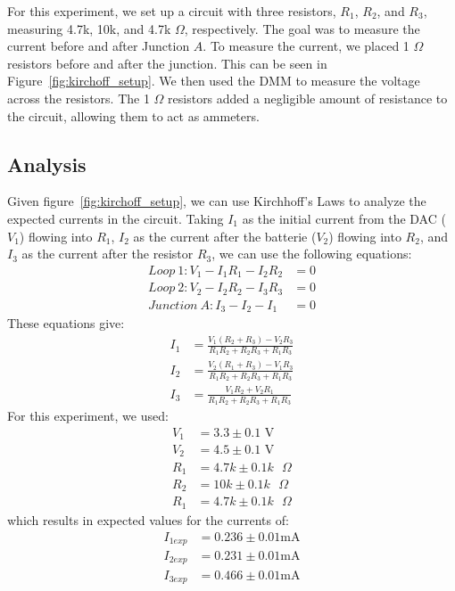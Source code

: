\documentclass[11pt]{article}
\begin{document}
    For this experiment, we set up a circuit with three resistors, $R_1$, $R_2$, and $R_3$, measuring 4.7k, 10k, and 4.7k $\Omega$, respectively.
    The goal was to measure the current before and after Junction $A$.
    To measure the current, we placed 1 $\Omega$ resistors before and after the junction.
    This can be seen in Figure~\ref{fig:kirchoff_setup}.
    We then used the DMM to measure the voltage across the resistors.
    The 1 $\Omega$ resistors added a negligible amount of resistance to the circuit, allowing them to act as ammeters.

    \subsection{Analysis}\label{subsec:kirchoff_analysis}

    Given figure~\ref{fig:kirchoff_setup}, we can use Kirchhoff's Laws to analyze the expected currents in the circuit.
    Taking $I_1$ as the initial current from the DAC ($V_1$) flowing into $R_1$, $I_2$ as the current after the batterie ($V_2$) flowing into $R_2$, and $I_3$ as the current after the resistor $R_3$, we can use the following equations:
    \begin{align*}
        Loop~1: V_1 - I_1 R_1 - I_2 R_2 &= 0 \\
        Loop~2: V_2 - I_2 R_2 - I_3 R_3 &= 0 \\
        Junction~A: I_3 - I_2 - I_1 &= 0
    \end{align*}
    These equations give:
    \begin{align*}
        I_1 &= \frac{V_1(R_2 + R_3) - V_2 R_3}{R_1 R_2 + R_2 R_3 + R_1 R_3} \\
        I_2 &= \frac{V_2(R_1 + R_3) - V_1 R_3}{R_1 R_2 + R_2 R_3 + R_1 R_3} \\
        I_3 &= \frac{V_1 R_2 + V_2 R_1}{R_1 R_2 + R_2 R_3 + R_1 R_3}
    \end{align*}
    For this experiment, we used:
    \begin{align*}
        V_1 &= 3.3 \pm 0.1 \text{ V} \\
        V_2 &= 4.5 \pm 0.1 \text{ V} \\
        R_1 &= 4.7k \pm 0.1k \text{ $\Omega$} \\
        R_2 &= 10k \pm 0.1k \text{ $\Omega$} \\
        R_1 &= 4.7k \pm 0.1k \text{ $\Omega$}
    \end{align*}
    which results in expected values for the currents of:
    \begin{align*}
        I_{1exp} &= 0.236 \pm 0.01 \text{mA} \\
        I_{2exp} &= 0.231 \pm 0.01 \text{mA} \\
        I_{3exp} &= 0.466 \pm 0.01 \text{mA}
    \end{align*}
\end{document}
